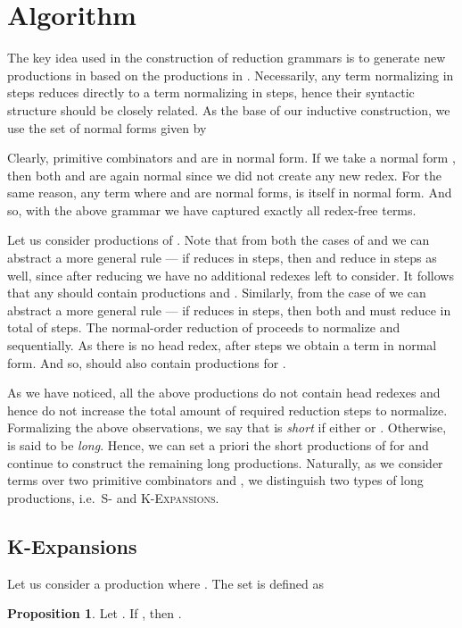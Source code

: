 \documentclass[11pt,a4paper]{amsart}
\theoremstyle{definition}
\newtheorem{prop}[theorem]{Proposition}
\begin{document}
\section{Algorithm}\label{sec:algorithm}

The key idea used in the construction of reduction grammars is to generate new productions in  based on the productions in . Necessarily, any term normalizing in  steps reduces directly to a term normalizing
in  steps, hence their syntactic structure should be closely related. As the base of our inductive construction, we use the set of normal forms  given by
 
 
 Clearly, primitive combinators  and  are in normal form. If we take a normal form , then both  and  are again normal since we did not create any new redex. For the same reason, any term  where  and  are normal forms, is itself in normal form. And so, with the above grammar we have captured exactly all redex-free terms.

Let us consider productions of . Note that from both the cases of  and  we can abstract a more general rule --- if  reduces in  steps, then  and  reduce in  steps as well, since after reducing  we have no additional redexes left to consider. It follows that any  should contain productions  and . Similarly, from the case of  we can abstract a more general rule --- if  reduces in  steps, then both  and  must reduce in total of  steps. The normal-order reduction of  proceeds to normalize  and  sequentially. As there is no head redex, after  steps we obtain a term in normal form. And so,  should also contain productions  for .
 
 As we have noticed, all the above productions do not contain head redexes and hence do not increase the total amount of required reduction steps to normalize. Formalizing the above observations, we say that  is \emph{short} if either  or . Otherwise,  is said to be \emph{long}. Hence, we can set a priori the short productions of  for  and continue to construct the remaining long productions. Naturally, as we consider terms over two primitive combinators  and , we distinguish two types of long productions, i.e.~\textsc{S-} and \textsc{K-Expansions}.
 
 \subsection{K-Expansions}\label{sec:k-expansions}
Let us consider a production  where . The set  is defined as


\begin{prop}\label{prop-K}
        Let . If , then .
\end{prop}
\end{document}
